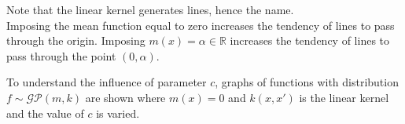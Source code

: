 Note that the linear kernel generates lines, hence the name.\\
Imposing the mean function equal to zero increases the tendency of lines to pass through the origin. Imposing $m(x)=\alpha\in\mathbb{R}$ increases the tendency of lines to pass through the point $(0,\alpha)$. 



\newpage






\vspace{1cm}
To understand the influence of parameter $c$, graphs of functions with distribution $f\sim \mathcal{GP}(m,k)$ are shown where $m(x)=0$ and $k(x,x')$ is the linear kernel and the value of $c$ is varied.

